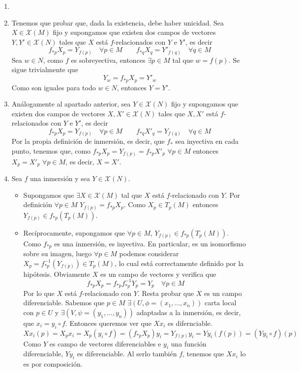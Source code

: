 \documentclass[twoside]{article}
\begin{document}
\begin{solucion}
\begin{enumerate}
\item[]
\item Tenemos que probar que, dada la existencia, debe haber unicidad. Sea $X\in\mathcal{X}(M)$ fijo y supongamos que existen dos campos de vectores $Y,Y'\in \mathcal{X}(N)$ tales que $X$ está $f$-relacionados con $Y$ e $Y'$, es decir
$$f_{\ast p}X_p = Y_{f(p)} \quad \forall p\in M \qquad
f_{\ast q}X_q = Y'_{f(q)} \quad \forall q\in M $$ 
Sea $w\in N$, como $f$ es sobreyectiva, entonces $\exists p \in M$ tal que $w=f(p)$. Se sigue trivialmente que
$$
Y_w = f_{\ast p}X_p = Y'_w
$$
Como son iguales para todo $w\in N$, entonces $Y=Y'$.
\item Análogamente al apartado anterior, sea $Y\in\mathcal{X}(N)$ fijo y supongamos que existen dos campos de vectores $X,X'\in \mathcal{X}(N)$ tales que $X,X'$ está $f$-relacionados con $Y$ e $Y'$, es decir
$$f_{\ast p}X_p = Y_{f(p)} \quad \forall p\in M \qquad
f_{\ast q}X'_q = Y_{f(q)} \quad \forall q\in M $$ 
Por la propia definición de inmersión, es decir, que $f_{\ast}$ sea inyectiva en cada punto, tenemos que, como $f_{\ast p}X_p = Y_{f(p)} = f_{\ast p}X'_p$ $\forall p\in M$ entonces $ X_p = X'_p$ $\forall p\in M$, es decir, $X=X'$.
\item Sea $f$ una inmersión y sea $Y \in \mathcal{X}(N)$.
\begin{itemize}
\item Supongamos que $\exists X \in \mathcal{X}(M)$ tal que $X$ está $f$-relacionado con $Y$. Por definición $\forall p\in M$ $Y_{f(p)}=f_{\ast p}X_p$. Como $X_p\in T_p(M)$ entonces ${Y_{f(p)}\in f_{\ast p}(T_p(M))}$.
\item Recíprocamente, supongamos que $\forall p \in M$, $Y_{f(p)}\in f_{\ast p}(T_p(M))$. Como $f_{\ast p}$ es una inmersión, es inyectiva. En particular, es un isomorfismo sobre su imagen, luego $\forall p\in M$ podemos considerar $X_p = f_{\ast p}^{-1}(Y_{f(p)})\in T_p(M)$, lo cual está correctamente definido por la hipótesis. Obviamente $X$ es un campo de vectores y verifica que
$$f_{\ast p} X_p = f_{\ast p} f_{\ast p}^{-1} Y_p = Y_p \quad \forall p \in M$$
Por lo que $X$ está $f$-relacionado con $Y$. Resta probar que $X$ es un campo diferenciable. Sabemos que $p\in M$ $\exists (U,\phi=(x_1,\dotsc,x_n))$ carta local con $p\in U$ y $\exists (V,\psi=(y_1,\dotsc,y_n))$ adaptadas a la inmersión, es decir, que $x_i = y_i \circ f$. Entonces queremos ver que $Xx_i$ es difernciable. 
$$Xx_i(p) = X_px_i= X_p(y_i \circ f) = (f_{\ast p}X_p) y_i = Y_{f(p)}y_i=Yy_i(f(p)) = (Y y_i \circ f)(p)$$
Como $Y$ es campo de vectores diferenciables e $y_i$ una función diferenciable, $Yy_i$ es diferenciable. Al serlo también $f$, tenemos que $Xx_i$ lo es por composición.
\end{itemize} 
\end{enumerate}
\end{solucion}
\end{document}
